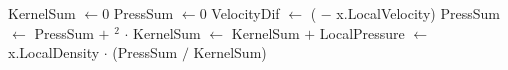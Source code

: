 \begin{center}
\begin{algorithmic}[1]
    \State KernelSum $\gets 0$
    \State PressSum $\gets 0$
        \State VelocityDif $\gets$ ( $-$ x.LocalVelocity)
        \State PressSum $\gets$ PressSum $+$ $^2$ $\cdot$ 
        \State KernelSum $\gets$ KernelSum $+$ 
    \EndFor
    \State LocalPressure $\gets$ x.LocalDensity $\cdot$ (PressSum $/$ KernelSum)
\EndFor
\EndFunction


\end{algorithmic}

\end{center}